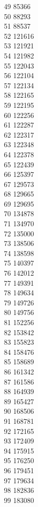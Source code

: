 { 49	85366 \\
 50	88293 \\
 51	88537 \\
 52	121616 \\
 53	121921 \\
 54	121982 \\
 55	122043 \\
 56	122104 \\
 57	122134 \\
 58	122165 \\
 59	122195 \\
 60	122256 \\
 61	122287 \\
 62	122317 \\
 63	122348 \\
 64	122378 \\
 65	122439 \\
 66	125397 \\
 67	129573 \\
 68	129665 \\
 69	129695 \\
 70	134878 \\
 71	134970 \\
 72	135000 \\
 73	138506 \\
 74	138598 \\
 75	140397 \\
 76	142012 \\
 77	149391 \\
 78	149634 \\
 79	149726 \\
 80	149756 \\
 81	152256 \\
 82	153842 \\
 83	155823 \\
 84	158476 \\
 85	158689 \\
 86	161342 \\
 87	161586 \\
 88	164939 \\
 89	165427 \\
 90	168506 \\
 91	168781 \\
 92	172165 \\
 93	172409 \\
 94	175915 \\
 95	176250 \\
 96	179451 \\
 97	179634 \\
 98	182836 \\
 99	183080 \\
}
